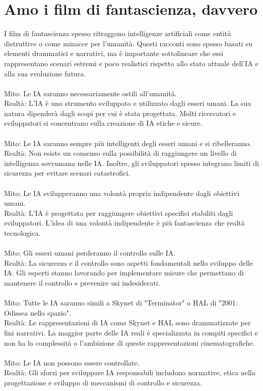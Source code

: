 \documentclass[12pt,a4paper]{report}
\begin{document}
\section{Amo i film di fantascienza, davvero}
I film di fantascienza spesso ritraggono intelligenze artificiali come entità distruttive o come minacce per l'umanità. Questi racconti sono spesso basati su elementi drammatici e narrativi, ma è importante sottolineare che essi rappresentano scenari estremi e poco realistici rispetto allo stato attuale dell'IA e alla sua evoluzione futura. \\
\\
Mito: Le IA saranno necessariamente ostili all'umanità.\\
Realtà: L'IA è uno strumento sviluppato e utilizzato dagli esseri umani. La sua natura dipenderà dagli scopi per cui è stata progettata. Molti ricercatori e sviluppatori si concentrano sulla creazione di IA etiche e sicure.\\
\\
Mito: Le IA saranno sempre più intelligenti degli esseri umani e si ribelleranno.\\
Realtà: Non esiste un consenso sulla possibilità di raggiungere un livello di intelligenza sovrumana nelle IA. Inoltre, gli sviluppatori spesso integrano limiti di sicurezza per evitare scenari catastrofici. \\
\\
Mito: Le IA svilupperanno una volontà propria indipendente dagli obiettivi umani.\\
Realtà: L'IA è progettata per raggiungere obiettivi specifici stabiliti dagli sviluppatori. L'idea di una volontà indipendente è più fantascienza che realtà tecnologica.\\
\\
Mito: Gli esseri umani perderanno il controllo sulle IA.\\
Realtà: La sicurezza e il controllo sono aspetti fondamentali nello sviluppo delle IA. Gli esperti stanno lavorando per implementare misure che permettano di mantenere il controllo e prevenire usi indesiderati.\\
\\
Mito: Tutte le IA saranno simili a Skynet di "Terminator" o HAL di "2001: Odissea nello spazio".\\
Realtà: Le rappresentazioni di IA come Skynet e HAL sono drammatizzate per fini narrativi. La maggior parte delle IA reali è specializzata in compiti specifici e non ha la complessità o l'ambizione di queste rappresentazioni cinematografiche.\\
\\
Mito: Le IA non possono essere controllate. \\
Realtà: Gli sforzi per sviluppare IA responsabili includono normative, etica nella progettazione e sviluppo di meccanismi di controllo e sicurezza.\\
\end{document}

